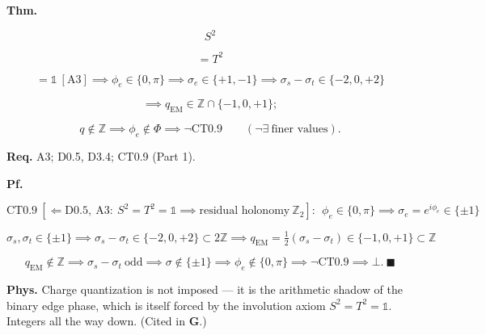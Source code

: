 \begin{theorem}\label{tag:EM-10}
\textbf{Thm.}

\[
S^2
\]

\[
= T^2
\]

\[
= \mathbb1\ [\mathrm{A3}]\implies\phi_e\in\{0,\pi\}\implies\sigma_e\in\{+1,-1\}\implies\sigma_{s}-\sigma_{t}\in\{-2,0,+2\}
\]

\[
\implies q_{\mathrm{EM}}\in\mathbb Z\cap\{-1,0,+1\};
\]

\[
q\notin\mathbb Z\implies\phi_e\notin\Phi\implies\neg\mathrm{CT0.9}\qquad(\neg\exists\ \text{finer values}).
\]

\textbf{Req.} A3; D0.5, D3.4; CT0.9 (Part 1).

\textbf{Pf.}

\[
\mathrm{CT0.9}\ [\Leftarrow\mathrm{D0.5},\ \mathrm{A3}:\ S^2=T^2=\mathbb1\implies\text{residual holonomy}\ \mathbb Z_2]:\ \ \phi_e\in\{0,\pi\}\implies\sigma_e=e^{i\phi_e}\in\{\pm1\}
\]

\[
\sigma_s,\sigma_t\in\{\pm1\}\implies\sigma_s-\sigma_t\in\{-2,0,+2\}\subset2\mathbb Z\implies q_{\mathrm{EM}}=\tfrac12(\sigma_s-\sigma_t)\in\{-1,0,+1\}\subset\mathbb Z
\]

\[
q_{\mathrm{EM}}\notin\mathbb Z\implies\sigma_s-\sigma_t\ \text{odd}\implies\sigma\notin\{\pm1\}\implies\phi_e\notin\{0,\pi\}\implies\neg\mathrm{CT0.9}\implies\bot.\ \blacksquare
\]

\textbf{Phys.} Charge quantization is not imposed — it is the arithmetic shadow of the binary edge phase, which is itself forced by the involution axiom $S^2=T^2=\mathbb1$. Integers all the way down. (Cited in \textbf{G}.)

\end{theorem}

